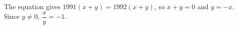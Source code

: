 The equation gives $1991(x+y)=1992(x+y)$, so $x+y=0$ and $y=-x$. Since $y\ne0$, $\dfrac xy=\boxed{-1}$.
